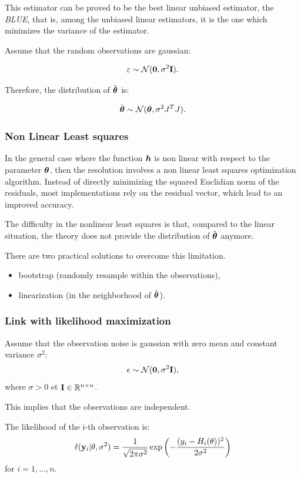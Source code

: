 \documentclass{beamer}
\begin{document}

\begin{frame}
This estimator can be proved to be the best linear unbiased estimator,
the \emph{BLUE}, that is, among the unbiased linear estimators, it is the one
which minimizes the variance of the estimator.

Assume that the random observations are gaussian:

$$
       \varepsilon \sim \mathcal{N}(\boldsymbol{0},\sigma^2 {\bf I}).
$$

Therefore, the distribution of $\hat{\boldsymbol{\theta}}$ is:

$$
       \hat{\boldsymbol{\theta}} \sim \mathcal{N}(\boldsymbol{\theta},\sigma^2 J^T J).
$$


\end{frame}


\begin{frame}
\frametitle{Non Linear Least squares}

In the general case where the function $\boldsymbol{h}$ is non linear
with respect to the parameter $\boldsymbol{\theta}$, then the resolution
involves a non linear least squares optimization algorithm. Instead of
directly minimizing the squared Euclidian norm of the residuals, most
implementations rely on the residual vector, which lead to an improved
accuracy.

The difficulty in the nonlinear least squares is that, compared to the
linear situation, the theory does not provide the distribution of
$\hat{\boldsymbol{\theta}}$ anymore.

There are two practical solutions to overcome this limitation.
\begin{itemize}
\item bootstrap (randomly resample within the observations),
\item linearization (in the neighborhood of $\hat{\boldsymbol{\theta}}$).
\end{itemize}

\end{frame}


\begin{frame}
\frametitle{Link with likelihood maximization}
Assume that the observation noise is gaussian with zero mean and constant 
variance $\sigma^2$: 
$$
\epsilon\sim \mathcal{N}({\bf 0},\sigma^2 {\bf I}),
$$ 
where $\sigma>0$ et ${\bf I}\in\mathbb{R}^{n\times n}$. 

This implies that the observations are independent. 

The likelihood of the i-th observation is:
$$
\ell({\bf y}_i|{\bf \theta},\sigma^2) = 
\frac{1}{\sqrt{2\pi \sigma^2}} 
\exp\left(-\frac{(y_i-H_i({\bf \theta}))^2}{2 \sigma^2}\right)
$$
for $i=1,...,n$. 
\end{frame}
\end{document}
